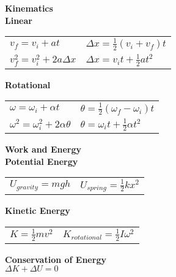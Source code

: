 \documentclass[12pt]{article}
\begin{document}
\begin{minipage}[t]{.5\textwidth}
\textbf{\large{Kinematics}} \\[6pt]
\textbf{Linear} \\[6pt]
	\begin{tabularx}{0.8\textwidth}{l X}
	$v_f = v_i + at$ & \hspace{12pt} $\Delta x = \tfrac{1}{2}(v_i + v_f)t$\\[6pt]
	$v_f^2 = v_i^2 + 2a \Delta x$ & \hspace{12pt} $\Delta x = v_i t + \tfrac{1}{2} at^2$\\[12pt]
	\end{tabularx}

\textbf{Rotational} \\[6pt]
	\begin{tabularx}{0.8\textwidth}{l X}
	$\omega = \omega_i +\alpha t$ & \hspace{12pt} $\theta = \tfrac{1}{2} (\omega_f - \omega_i) t$ \\[6pt]
	$\omega^2 = \omega_i^2 + 2\alpha \theta$ & \hspace{12pt} $\theta = \omega_i t + \tfrac{1}{2} \alpha t^2$ \\
	\end{tabularx}
\end{minipage}

\vspace{24pt}
\begin{minipage}[t]{.5\textwidth}
\textbf{\large{Work and Energy}} \\[6pt]
\textbf{Potential Energy} \\[6pt]
	\begin{tabular}{l l}
	$U_{gravity} = mgh$ \hspace{12pt} & $U_{spring} = \tfrac{1}{2} kx^2$ \\[12pt]
	\end{tabular}

\textbf{Kinetic Energy} \\[6pt]
	\begin{tabular}{l l}
	$K = \tfrac{1}{2}mv^2$ \hspace{12pt} & $K_{rotational} = \tfrac{1}{2} I \omega^2$ \\[12pt]
	\end{tabular}

\textbf{Conservation of Energy} \\[6pt]
	$\Delta K + \Delta U = 0$

\end{minipage}
\end{document}
